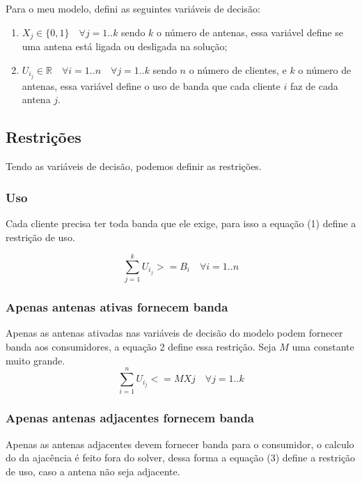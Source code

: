 \documentclass{article}
\begin{document}
    Para o meu modelo, defini as seguintes variáveis de decisão:

    \begin{enumerate}
        \item $X_j \in \{0, 1\} \quad \forall j = 1..k$ \quad sendo $k$ o número de antenas, essa variável define se uma antena está ligada ou
        desligada na solução;
        \item $U_i_j \in \mathbb{R} \quad \forall i = 1..n \quad \forall j = 1..k$ \quad sendo $n$ o número de clientes, e $k$ o número de antenas, essa variável define o uso de banda que cada cliente $i$ faz de cada antena $j$.
    \end{enumerate}

    \subsection{Restrições}
    Tendo as variáveis de decisão, podemos definir as restrições.

    \subsubsection{Uso}
    Cada cliente precisa ter toda banda que ele exige, para isso a equação (1) define a restrição de uso.

    \begin{equation}
        \sum_{j = 1}^{k} U_i_j >= B_i \quad
        \forall i=1..n
    \end{equation}

    \subsubsection{Apenas antenas ativas fornecem banda}
    Apenas as antenas ativadas nas variáveis de decisão do modelo podem fornecer banda aos consumidores, a equação 2 define essa restrição. \linebreak
    Seja $M$ uma constante muito grande.
    \begin{equation}
        \sum_{i = 1}^{n} U_i_j <= M Xj \quad
        \forall j=1..k
    \end{equation}

    \subsubsection{Apenas antenas adjacentes fornecem banda}
    Apenas as antenas adjacentes devem fornecer banda para o consumidor,
    o calculo do da ajacência é feito fora do solver, dessa forma a equação (3) define
    a restrição de uso, caso a antena não seja adjacente.
\end{document}
